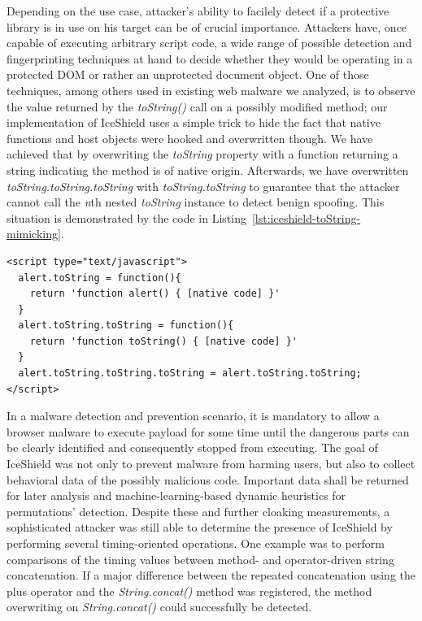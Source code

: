     Depending on the use case, attacker's ability to facilely detect if a protective library is in use on his target can be of crucial importance. Attackers have, once capable of executing arbitrary script code, a wide range of possible detection and fingerprinting techniques at hand to decide whether they would be operating in a protected DOM or rather an unprotected document object. One of those techniques, among others used in existing web malware we analyzed, is to observe the value returned by the \textit{toString()} call on a possibly modified method; our implementation of IceShield uses a simple trick to hide the fact that native functions and host objects were hooked and overwritten though. We have achieved that by overwriting the \textit{toString} property with a function returning a string indicating the method is of native origin. Afterwards, we have overwritten \textit{toString.toString.toString} with \textit{toString.toString} to guarantee that the attacker cannot call the \textit{n}th nested \textit{toString} instance to detect benign spoofing. This situation is demonstrated by the code in Listing~\ref{lst:iceshield-toString-mimicking}. 

\begin{lstlisting}[captionpos=b,caption=Approach for effective toString mimicking, label=lst:iceshield-toString-mimicking]
<script type="text/javascript">
  alert.toString = function(){ 
    return 'function alert() { [native code] }'
  }
  alert.toString.toString = function(){ 
    return 'function toString() { [native code] }'
  }
  alert.toString.toString.toString = alert.toString.toString;
</script>
\end{lstlisting}

    In a malware detection and prevention scenario, it is mandatory to allow a browser malware to execute payload for some time until the dangerous parts can be clearly identified and consequently stopped from executing. The goal of IceShield was not only to prevent malware from harming users, but also to collect behavioral data of the possibly malicious code. Important data shall be returned for later analysis and machine-learning-based dynamic heuristics for permutations' detection. Despite these and further cloaking measurements, a sophisticated attacker was still able to determine the presence of IceShield by performing several timing-oriented operations. One example was to perform comparisons of the timing values between method- and operator-driven string  concatenation. If a major difference between the repeated concatenation using the plus operator and the \textit{String.concat()} method was registered, the method overwriting on \textit{String.concat()} could successfully be detected. \\


